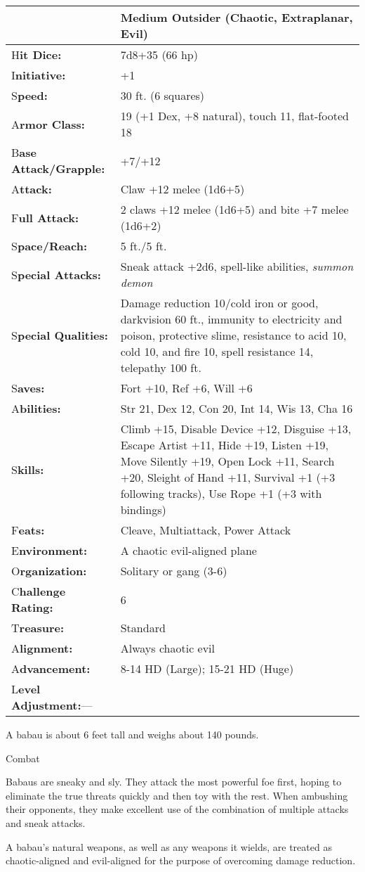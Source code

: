 \documentclass{article}
\begin{document}
\begin{tabular}{|>{\raggedright}p{91pt}|>{\raggedright}p{213pt}|}
\hline
  & Medium Outsider (Chaotic, Extraplanar, Evil)\tabularnewline
\hline
H\textbf{it Dice:} & 7d8+35 (66 hp)\tabularnewline
\hline
I\textbf{nitiative:} & +1\tabularnewline
\hline
S\textbf{peed:} & 30 ft. (6 squares)\tabularnewline
\hline
A\textbf{rmor Class:} & 19 (+1 Dex, +8 natural), touch 11, flat-footed 18\tabularnewline
\hline
B\textbf{ase Attack/Grapple:} & +7/+12\tabularnewline
\hline
A\textbf{ttack:} & Claw +12 melee (1d6+5)\tabularnewline
\hline
F\textbf{ull Attack:} & 2 claws +12 melee (1d6+5) and bite +7 melee (1d6+2)\tabularnewline
\hline
S\textbf{pace/Reach:} & 5 ft./5 ft.\tabularnewline
\hline
S\textbf{pecial Attacks:} & Sneak attack +2d6, spell-like abilities, \textit{summon 
demon}\tabularnewline
\hline
S\textbf{pecial Qualities:} & Damage reduction 10/cold iron or good, darkvision 
60 ft., immunity to electricity and poison, protective slime, resistance to acid 
10, cold 10, and fire 10, spell resistance 14, telepathy 100 ft.\tabularnewline
\hline
S\textbf{aves:} & Fort +10, Ref +6, Will +6\tabularnewline
\hline
A\textbf{bilities:} & Str 21, Dex 12, Con 20, Int 14, Wis 13, Cha 16\tabularnewline
\hline
S\textbf{kills:} & Climb +15, Disable Device +12, Disguise +13, Escape Artist +11, 
Hide +19, Listen +19, Move Silently +19, Open Lock +11, Search +20, Sleight of 
Hand +11, Survival +1 (+3 following tracks), Use Rope +1 (+3 with bindings)\tabularnewline
\hline
F\textbf{eats:} & Cleave, Multiattack, Power Attack\tabularnewline
\hline
E\textbf{nvironment:} & A chaotic evil-aligned plane\tabularnewline
\hline
O\textbf{rganization:} & Solitary or gang (3-6)\tabularnewline
\hline
C\textbf{hallenge Rating:} & 6\tabularnewline
\hline
T\textbf{reasure:} & Standard\tabularnewline
\hline
A\textbf{lignment:} & Always chaotic evil\tabularnewline
\hline
A\textbf{dvancement:} & 8-14 HD (Large); 15-21 HD (Huge)\tabularnewline
\hline
L\textbf{evel Adjustment:}--- & \tabularnewline
\hline
\end{tabular}

A babau is about 6 feet tall and weighs about 140 pounds.

Combat

Babaus are sneaky and sly. They attack the most powerful foe first, hoping to eliminate 
the true threats quickly and then toy with the rest. When ambushing their opponents, 
they make excellent use of the combination of multiple attacks and sneak attacks.

A babau's natural weapons, as well as any weapons it wields, are treated as chaotic-aligned 
and evil-aligned for the purpose of overcoming damage reduction.
\end{document}

